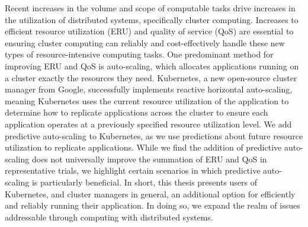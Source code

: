 Recent increases in the volume and scope of computable tasks drive increases in
the utilization of distributed systems, specifically cluster computing.
Increases to efficient resource utilization (ERU) and quality of service (QoS)
are essential to ensuring cluster computing can reliably and cost-effectively handle
these new types of resource-intensive computing tasks. One predominant
method for improving ERU and QoS is auto-scaling,
which allocates applications running on a cluster exactly the
resources they need. Kubernetes, a new open-source cluster manager from
Google, successfully implements reactive horizontal auto-scaling, meaning
Kubernetes uses the current resource utilization of
the application to determine how to
replicate applications across the cluster to ensure each application operates
at a previously specified resource utilization level. We add predictive
auto-scaling to Kubernetes, as we use predictions about future resource
utilization to replicate applications. While we find
the addition of predictive auto-scaling does not universally improve the
summation of ERU and QoS in representative trials, we highlight certain
scenarios in which predictive auto-scaling is particularly beneficial. In short,
this thesis presents users of Kubernetes, and cluster managers in general, an
additional option for efficiently and reliably running their application. In
doing so, we expand the realm of issues addressable through computing with
distributed systems.
